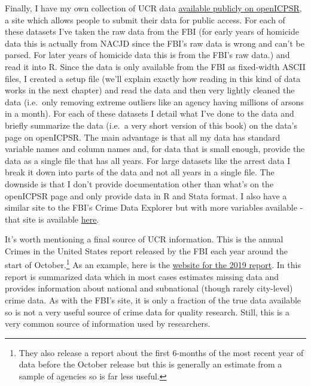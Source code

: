 \documentclass[
  12pt,
  openany]{book}
\begin{document}
Finally, I have my own collection of UCR data \href{https://www.openicpsr.org/openicpsr/search/studies?start=0\&ARCHIVE=openicpsr\&sort=score\%20desc\%2CDATEUPDATED\%20desc\&rows=25\&q=jacob\%20kaplan\%27s\%20concatenated\%20files}{available publicly on openICPSR}, a site which allows people to submit their data for public access. For each of these datasets I've taken the raw data from the FBI (for early years of homicide data this is actually from NACJD since the FBI's raw data is wrong and can't be parsed. For later years of homicide data this is from the FBI's raw data.) and read it into R. Since the data is only available from the FBI as fixed-width ASCII files, I created a setup file (we'll explain exactly how reading in this kind of data works in the next chapter) and read the data and then very lightly cleaned the data (i.e.~only removing extreme outliers like an agency having millions of arsons in a month). For each of these datasets I detail what I've done to the data and briefly summarize the data (i.e.~a very short version of this book) on the data's page on openICPSR. The main advantage is that all my data has standard variable names and column names and, for data that is small enough, provide the data as a single file that has all years. For large datasets like the arrest data I break it down into parts of the data and not all years in a single file. The downside is that I don't provide documentation other than what's on the openICPSR page and only provide data in R and Stata format. I also have a similar site to the FBI's Crime Data Explorer but with more variables available - that site is available \href{jacobdkaplan.com/}{here}.

It's worth mentioning a final source of UCR information. This is the annual Crimes in the United States report released by the FBI each year around the start of October.\footnote{They also release a report about the first 6-months of the most recent year of data before the October release but this is generally an estimate from a sample of agencies so is far less useful.} As an example, here is the \href{https://ucr.fbi.gov/crime-in-the-u.s/2019/crime-in-the-u.s.-2019}{website for the 2019 report}. In this report is summarized data which in most cases estimates missing data and provides information about national and subnational (though rarely city-level) crime data. As with the FBI's site, it is only a fraction of the true data available so is not a very useful source of crime data for quality research. Still, this is a very common source of information used by researchers.
\end{document}
